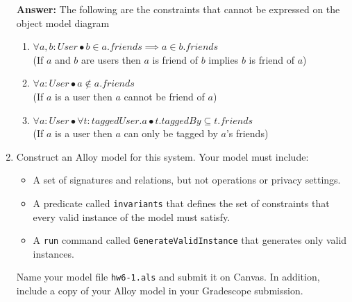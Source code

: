\begin{enumerate}
        \textbf {Answer:} The following are the constraints that cannot be expressed on the object model diagram
            \begin {enumerate}
                \item $ \forall a, b: User \bullet b \in a.friends \implies a \in b.friends $\\
(If $a$ and $b$ are users then $a$ is friend of $b$ implies $b$ is friend of $a$)
                \item $ \forall a : User \bullet a \notin a.friends $\\
                    (If $a$ is a user then $a$ cannot be friend of $a$)
                \item $ \forall a : User \bullet \forall t : taggedUser.a \bullet t.taggedBy \subseteq t.friends $ \\
                    (If $a$ is a user then $a$ can only be tagged by $a$’s friends)
            \end {enumerate}
	\item Construct an Alloy model for this system. Your model must
	      include:
	      \begin{itemize}
		      \item A set of signatures and relations, but not operations or
		            privacy settings.
		      \item A predicate called \texttt{invariants} that defines the
		            set of constraints that every valid instance of the model must satisfy.
		      \item A \texttt{run} command called \texttt{GenerateValidInstance} that generates only valid instances.
	      \end{itemize}
	      Name your model file \texttt{hw6-1.als}  and submit it on
	      Canvas. In addition, include a copy of your Alloy model in your
	      Gradescope submission. 
\end{enumerate}
